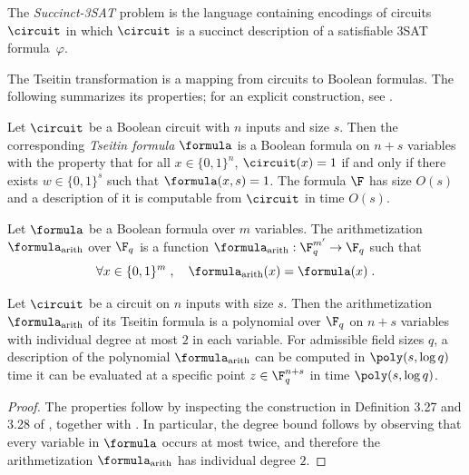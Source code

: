 \begin{definition}
  The \emph{Succinct-3SAT} problem is the language containing encodings of
  circuits~$\circuit$ in which $\circuit$ is a succinct description of a
  satisfiable 3SAT formula~$\varphi$.
\end{definition}



The Tseitin transformation is a mapping from circuits to Boolean
formulas. The following summarizes its properties; for an explicit
construction, see \cite[Section 3.8]{NW19}.
\begin{definition}
  \label{def:tseitin}
  Let $\circuit$ be a Boolean circuit with $n$ inputs and size $s$. Then the corresponding \emph{Tseitin formula} $\formula$ is a
  Boolean formula on $n+s$ variables with the property that for all $x
  \in \{0,1\}^n$, $\circuit(x) = 1$ if and only if there exists $w \in
\{0,1\}^s$ such that $\formula(x, s) = 1$. The formula $\F$ has size
$O(s)$ and a description of it is computable from $\circuit$ in time $O(s)$.
\end{definition}

\begin{definition}
  \label{def:formula-arithmetization}
  Let $\formula$ be a Boolean formula over $m$ variables. The arithmetization
  $\formula_{\mathrm{arith}}$ over $\F_q$ is a function
  $\formula_{\mathrm{arith}}:\F_q^{m'}\rightarrow \F_q$ such that
  \begin{equation}
    \label{eq:farith}
    \forall x \in \{0, 1\}^{m}\;,
    \quad \formula_{\mathrm{arith}}(x) = \formula(x)\;.
  \end{equation}
  
\end{definition}

\begin{proposition}
  \label{prop:tseitin-arith-degree}
  Let $\circuit$ be a circuit on $n$ inputs with size $s$. Then the
  arithmetization $\formula_{\mathrm{arith}}$ of its Tseitin formula
  is a polynomial over $\F_q$ on $n +s$ variables with individual
  degree at most $2$ in each variable. For admissible field sizes $q$,
  a description of the polynomial
  $\formula_{\mathrm{arith}}$ can be computed in $\poly(s, \log q)$ time
  it can be evaluated at a specific point $z \in \F_q^{n+s}$ in time
  $\poly(s, \log q)$.
\end{proposition}
\begin{proof}
    The properties follow by inspecting the construction in Definition
    3.27 and 3.28 of \cite{NW19}, together with
    . In particular, the degree bound
    follows by observing that every variable in
    $\formula$ occurs at most twice, and therefore the arithmetization
    $\formula_{\mathrm{arith}}$ has individual degree $2$.
\end{proof}

